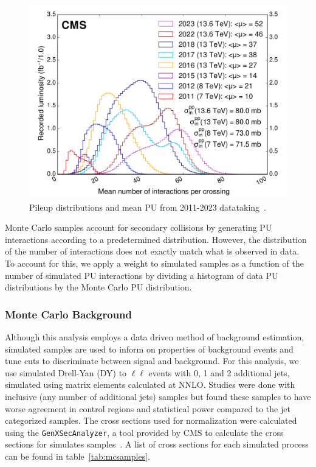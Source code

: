 \begin{figure}[htb!]
	\centering
	\includegraphics[width=0.8\linewidth]{figs/05_analysis/pileup_allYears.pdf}
	\caption[Pileup distributions and mean PU from 2011-2023 datataking~\cite{CMSlumi}.]{Pileup distributions and mean PU from 2011-2023 datataking~\cite{CMSlumi}.}
	\label{fig:pileup}
\end{figure}

Monte Carlo samples account for secondary collisions by generating PU interactions according to a predetermined distribution. However, the distribution of the number of interactions does not exactly match what is observed in data. To account for this, we apply a weight to simulated samples as a function of the number of simulated PU interactions by dividing a histogram of data PU distributions by the Monte Carlo PU distribution.

\subsubsection{Monte Carlo Background} \label{sec:ana_mcbkg}
Although this analysis employs a data driven method of background estimation, simulated samples are used to inform on properties of background events and tune cuts to discriminate between signal and background. For this analysis, we use simulated Drell-Yan (DY) to $\ell\ell$ events with 0, 1 and 2 additional jets, simulated using matrix elements calculated at NNLO. Studies were done with inclusive (any number of additional jets) samples but found these samples to have worse agreement in control regions and statistical power compared to the jet categorized samples. The cross sections used for normalization were calculated using the \texttt{GenXSecAnalyzer}, a tool provided by CMS to calculate the cross sections for simulates samples~\cite{genxsecana}. A list of cross sections for each simulated process can be found in table~\ref{tab:mcsamples}.

